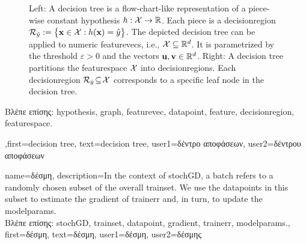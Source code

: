 {{\begin{figure}[H]
\begin{minipage}{.45\textwidth}
\end{minipage}
	\caption{Left: A decision tree is a flow-chart-like representation of a piece-wise constant \gls{hypothesis} $h: \mathcal{X} \rightarrow \mathbb{R}$.  Each piece is a \gls{decisionregion} $\mathcal{R}_{\hat{y}} := \big\{ {\bf x} \in  \mathcal{X}: h({\bf x}) = \hat{y} \big\}$. 
		The depicted decision tree can be applied to numeric \gls{featurevec}s, i.e., $\mathcal{X} \subseteq \mathbb{R}^{d}$. It is  parametrized by the threshold $\varepsilon>0$ and the vectors ${\bf u}, {\bf v} \in \mathbb{R}^{d}$. 
		Right: A decision tree partitions  
		the \gls{featurespace} $\mathcal{X}$ into \gls{decisionregion}s. Each \gls{decisionregion}  
		$\mathcal{R}_{\hat{y}} \!\subseteq\!\mathcal{X}$ corresponds to a specific leaf node in the decision tree.}
	\label{fig_decision_tree}
\end{figure} 
\foreignlanguage{greek}{Βλέπε επίσης:} \gls{hypothesis}, \gls{graph}, \gls{featurevec}, \gls{datapoint}, \gls{feature}, \gls{decisionregion}, \gls{featurespace}.
	  }
	  ,first={decision tree},
	  text={decision tree},
	  user1={\foreignlanguage{greek}{δέντρο αποφάσεων}}, %
	  user2={\foreignlanguage{greek}{δέντρου αποφάσεων}} %
}

{
	name={\foreignlanguage{greek}{δέσμη}},
	description={In the context of \gls{stochGD}, a batch refers to a randomly 
	chosen subset of the overall \gls{trainset}. We use the \gls{datapoint}s in this subset 
	to estimate the \gls{gradient} of \gls{trainerr} and, in turn, to update the \gls{modelparams}.\\
	\foreignlanguage{greek}{Βλέπε επίσης:} \gls{stochGD}, \gls{trainset}, \gls{datapoint}, \gls{gradient}, \gls{trainerr}, \gls{modelparams}.}, 
	first={\foreignlanguage{greek}{δέσμη}},
	text={\foreignlanguage{greek}{δέσμη}},
	user1={\foreignlanguage{greek}{δέσμη}}, %
    	user2={\foreignlanguage{greek}{δέσμης}} %
}

